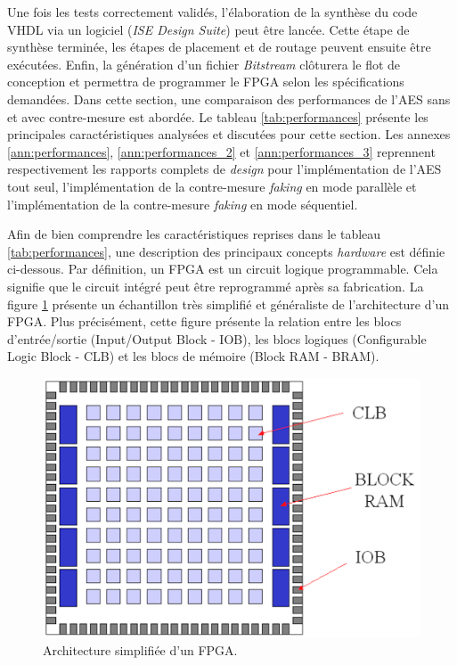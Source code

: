 \documentclass[oneside]{book}
\begin{document}
Une fois les tests correctement validés, l'élaboration de la synthèse du code VHDL via un logiciel (\textit{ISE Design Suite}) peut être lancée. Cette étape de synthèse terminée, les étapes de placement et de routage peuvent ensuite être exécutées. Enfin, la génération d'un fichier \textit{Bitstream} clôturera le flot de conception et permettra de programmer le FPGA selon les spécifications demandées. Dans cette section, une comparaison des performances de l'AES sans et avec contre-mesure est abordée. Le tableau \ref{tab:performances} présente les principales caractéristiques analysées et discutées pour cette section. Les annexes \ref{ann:performances}, \ref{ann:performances_2} et \ref{ann:performances_3} reprennent respectivement les rapports complets de \textit{design} pour l'implémentation de l'AES tout seul, l'implémentation de la contre-mesure \textit{faking} en mode parallèle et l'implémentation de la contre-mesure \textit{faking} en mode séquentiel.

Afin de bien comprendre les caractéristiques reprises dans le tableau \ref{tab:performances}, une description des principaux concepts \textit{hardware} est définie ci-dessous. Par définition, un FPGA est un circuit logique programmable. Cela signifie que le circuit intégré peut être reprogrammé après sa fabrication. La figure \ref{fig:general_archi_FPGA} présente un échantillon très simplifié et généraliste de l'architecture d'un FPGA. Plus précisément, cette figure présente la relation entre les blocs d'entrée/sortie (Input/Output Block - IOB), les blocs logiques (Configurable Logic Block - CLB) et les blocs de mémoire (Block RAM - BRAM).

\begin{figure}[htbp]
    \centering
    \includegraphics[scale=0.5]{image/general_archi_FPGA}
    \caption{Architecture simplifiée d'un FPGA.}
    \label{fig:general_archi_FPGA} 
\end{figure}
\end{document}
